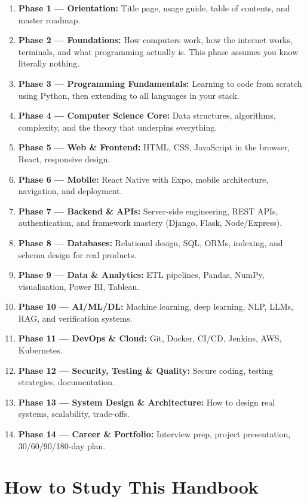 \documentclass[12pt, a4paper, oneside]{book}
\begin{document}
\begin{enumerate}[leftmargin=2em]
    \item \textbf{Phase 1 — Orientation:} Title page, usage guide, table of contents, and master roadmap.
    \item \textbf{Phase 2 — Foundations:} How computers work, how the internet works, terminals, and what programming actually is. This phase assumes you know literally nothing.
    \item \textbf{Phase 3 — Programming Fundamentals:} Learning to code from scratch using Python, then extending to all languages in your stack.
    \item \textbf{Phase 4 — Computer Science Core:} Data structures, algorithms, complexity, and the theory that underpins everything.
    \item \textbf{Phase 5 — Web \& Frontend:} HTML, CSS, JavaScript in the browser, React, responsive design.
    \item \textbf{Phase 6 — Mobile:} React Native with Expo, mobile architecture, navigation, and deployment.
    \item \textbf{Phase 7 — Backend \& APIs:} Server-side engineering, REST APIs, authentication, and framework mastery (Django, Flask, Node/Express).
    \item \textbf{Phase 8 — Databases:} Relational design, SQL, ORMs, indexing, and schema design for real products.
    \item \textbf{Phase 9 — Data \& Analytics:} ETL pipelines, Pandas, NumPy, visualisation, Power BI, Tableau.
    \item \textbf{Phase 10 — AI/ML/DL:} Machine learning, deep learning, NLP, LLMs, RAG, and verification systems.
    \item \textbf{Phase 11 — DevOps \& Cloud:} Git, Docker, CI/CD, Jenkins, AWS, Kubernetes.
    \item \textbf{Phase 12 — Security, Testing \& Quality:} Secure coding, testing strategies, documentation.
    \item \textbf{Phase 13 — System Design \& Architecture:} How to design real systems, scalability, trade-offs.
    \item \textbf{Phase 14 — Career \& Portfolio:} Interview prep, project presentation, 30/60/90/180-day plan.
\end{enumerate}

\section*{How to Study This Handbook}
\end{document}

